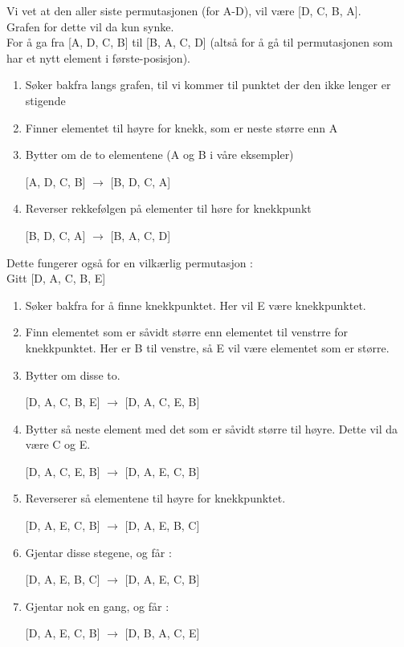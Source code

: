 \documentclass[11pt]{article}
\begin{document}
Vi vet at den aller siste permutasjonen (for A-D), vil være [D, C, B, A]. \\
Grafen for dette vil da kun synke. \\
For å ga fra [A, D, C, B] til [B, A, C, D] (altså for å gå til permutasjonen som har et nytt element i første-posisjon).\\
\begin{enumerate}
	\item Søker bakfra langs grafen, til vi kommer til punktet der den ikke lenger er stigende
	\item Finner elementet til høyre for knekk, som er neste større enn A
	\item Bytter om de to elementene (A og B i våre eksempler)

	      [A, D, C, B] $\rightarrow$ [B, D, C, A]
	\item Reverser rekkefølgen på elementer til høre for knekkpunkt

		      [B, D, C, A] $\rightarrow$ [B, A, C, D]
\end{enumerate}

Dette fungerer også for en vilkærlig permutasjon : \\
Gitt [D, A, C, B, E]
\begin{enumerate}
	\item Søker bakfra for å finne knekkpunktet. Her vil E være knekkpunktet.
	\item Finn elementet som er såvidt større enn elementet til venstrre for knekkpunktet. Her er B til venstre, så E vil være elementet som er større.
	\item Bytter om disse to.

		      [D, A, C, B, E] $\rightarrow$ [D, A, C, E, B]
	\item Bytter så neste element med det som er såvidt større til høyre. Dette vil da være C og E.

		      [D, A, C, E, B] $\rightarrow$ [D, A, E, C, B]
	\item Reverserer så elementene til høyre for knekkpunktet.

		      [D, A, E, C, B] $\rightarrow$ [D, A, E, B, C]
	\item Gjentar disse stegene, og får :

	      [D, A, E, B, C] $\rightarrow$ [D, A, E, C, B]
	\item Gjentar nok en gang, og får :

	      [D, A, E, C, B] $\rightarrow$ [D, B, A, C, E]
\end{enumerate}
\end{document}
